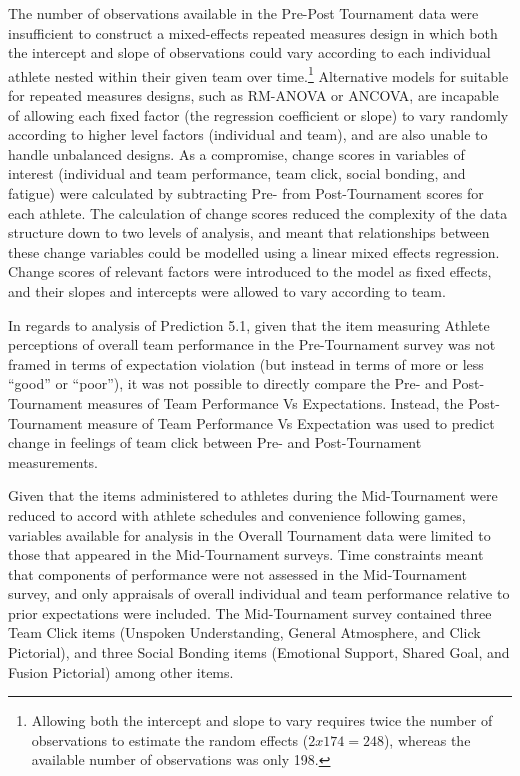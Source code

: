 \begin{CJK}{UTF8}{gbsn}
 The number of observations available in the Pre-Post Tournament data were insufficient to construct a mixed-effects repeated measures design in which both the intercept and slope of observations could vary according to each individual athlete nested within their given team over time.\footnote{Allowing both the intercept and slope to vary requires twice the number of observations to estimate the random effects ($2x174 = 248$), whereas the available number of observations was only 198.}
 Alternative models for suitable for repeated measures designs, such as RM-ANOVA or ANCOVA, are incapable of allowing each fixed factor (the regression coefficient or slope) to vary randomly according to higher level factors (individual and team), and are also unable to handle unbalanced designs.  As a compromise, change scores in variables of interest (individual and team performance, team click, social bonding, and fatigue) were calculated by subtracting Pre- from Post-Tournament scores for each athlete. The calculation of change scores reduced the complexity of the data structure down to two levels of analysis, and meant that relationships between these change variables could be modelled using a linear mixed effects regression. Change scores of relevant factors were introduced to the model as fixed effects, and their slopes and intercepts were allowed to vary according to team.

 In regards to analysis of Prediction 5.1, given that the item measuring Athlete perceptions of overall team performance in the Pre-Tournament survey was not framed in terms of expectation violation (but instead in terms of more or less ``good'' or ``poor''), it was not possible to directly compare the Pre- and Post-Tournament measures of Team Performance Vs Expectations.  Instead, the Post-Tournament measure of Team Performance Vs Expectation was used to predict change in feelings of team click between Pre- and Post-Tournament measurements.


Given that the items administered to athletes during the Mid-Tournament were reduced to accord with athlete schedules and convenience following games, variables available for analysis in the Overall Tournament data were limited to those that appeared in the Mid-Tournament surveys.  Time constraints meant that components of performance were not assessed in the Mid-Tournament survey, and only appraisals of overall individual and team performance relative to prior expectations were included.  The Mid-Tournament survey contained three Team Click items (Unspoken Understanding, General Atmosphere, and Click Pictorial), and three Social Bonding items (Emotional Support, Shared Goal, and Fusion Pictorial) among other items.


\end{CJK}
